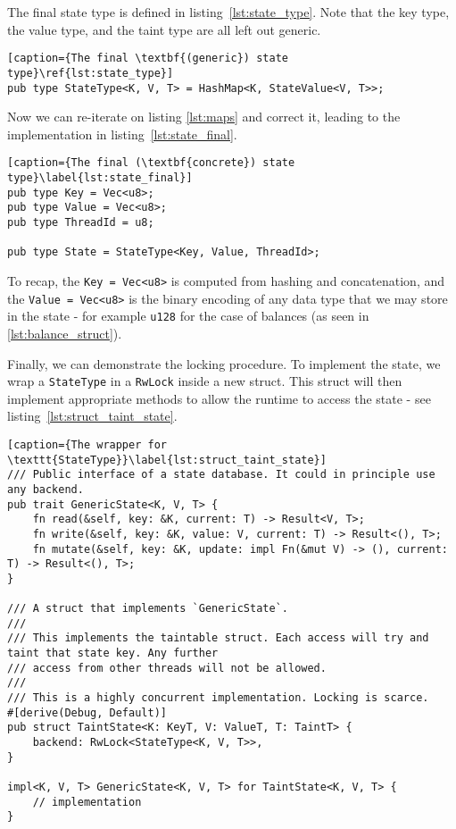 The final state type is defined in listing~\ref{lst:state_type}. Note that the key type, the value type, and the taint type are all left out generic.

\begin{lstlisting}[caption={The final \textbf{(generic}) state type}\ref{lst:state_type}]
pub type StateType<K, V, T> = HashMap<K, StateValue<V, T>>;
\end{lstlisting}

Now we can re-iterate on listing \ref{lst:maps} and correct it, leading to the implementation in listing~\ref{lst:state_final}. 
\begin{lstlisting}[caption={The final (\textbf{concrete}) state type}\label{lst:state_final}]
pub type Key = Vec<u8>;
pub type Value = Vec<u8>;
pub type ThreadId = u8;

pub type State = StateType<Key, Value, ThreadId>;
\end{lstlisting}

To recap, the \texttt{Key = Vec<u8>} is computed from hashing and concatenation, and the
\texttt{Value = Vec<u8>} is the binary encoding of any data type that we may store in the state - for
example \texttt{u128} for the case of balances (as seen in \ref{lst:balance_struct}).

Finally, we can demonstrate the locking procedure. To implement the state, we wrap a
\texttt{StateType} in a \texttt{RwLock} inside a new struct. 
This struct will then implement appropriate methods to allow the runtime to access the state - see listing~\ref{lst:struct_taint_state}.

\begin{lstlisting}[caption={The wrapper for \texttt{StateType}}\label{lst:struct_taint_state}]
/// Public interface of a state database. It could in principle use any backend.
pub trait GenericState<K, V, T> {
	fn read(&self, key: &K, current: T) -> Result<V, T>;
	fn write(&self, key: &K, value: V, current: T) -> Result<(), T>;
	fn mutate(&self, key: &K, update: impl Fn(&mut V) -> (), current: T) -> Result<(), T>;
}

/// A struct that implements `GenericState`.
///
/// This implements the taintable struct. Each access will try and taint that state key. Any further
/// access from other threads will not be allowed.
///
/// This is a highly concurrent implementation. Locking is scarce.
#[derive(Debug, Default)]
pub struct TaintState<K: KeyT, V: ValueT, T: TaintT> {
	backend: RwLock<StateType<K, V, T>>,
}

impl<K, V, T> GenericState<K, V, T> for TaintState<K, V, T> {
	// implementation
}
\end{lstlisting}

